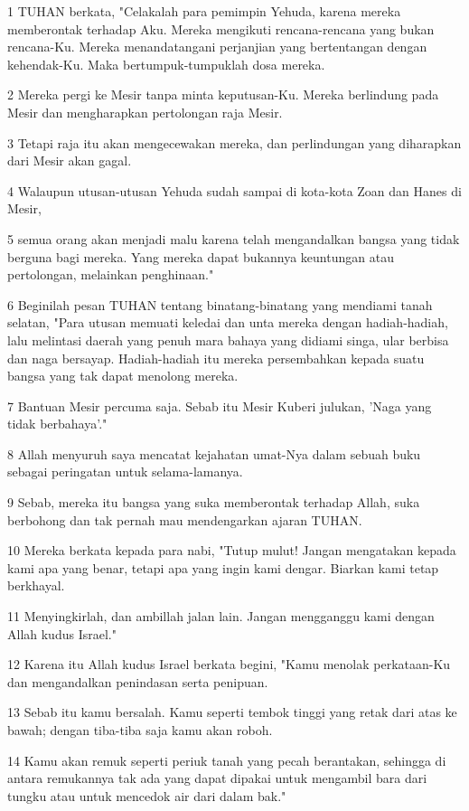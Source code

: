 \par 1 TUHAN berkata, "Celakalah para pemimpin Yehuda, karena mereka memberontak terhadap Aku. Mereka mengikuti rencana-rencana yang bukan rencana-Ku. Mereka menandatangani perjanjian yang bertentangan dengan kehendak-Ku. Maka bertumpuk-tumpuklah dosa mereka.
\par 2 Mereka pergi ke Mesir tanpa minta keputusan-Ku. Mereka berlindung pada Mesir dan mengharapkan pertolongan raja Mesir.
\par 3 Tetapi raja itu akan mengecewakan mereka, dan perlindungan yang diharapkan dari Mesir akan gagal.
\par 4 Walaupun utusan-utusan Yehuda sudah sampai di kota-kota Zoan dan Hanes di Mesir,
\par 5 semua orang akan menjadi malu karena telah mengandalkan bangsa yang tidak berguna bagi mereka. Yang mereka dapat bukannya keuntungan atau pertolongan, melainkan penghinaan."
\par 6 Beginilah pesan TUHAN tentang binatang-binatang yang mendiami tanah selatan, "Para utusan memuati keledai dan unta mereka dengan hadiah-hadiah, lalu melintasi daerah yang penuh mara bahaya yang didiami singa, ular berbisa dan naga bersayap. Hadiah-hadiah itu mereka persembahkan kepada suatu bangsa yang tak dapat menolong mereka.
\par 7 Bantuan Mesir percuma saja. Sebab itu Mesir Kuberi julukan, 'Naga yang tidak berbahaya'."
\par 8 Allah menyuruh saya mencatat kejahatan umat-Nya dalam sebuah buku sebagai peringatan untuk selama-lamanya.
\par 9 Sebab, mereka itu bangsa yang suka memberontak terhadap Allah, suka berbohong dan tak pernah mau mendengarkan ajaran TUHAN.
\par 10 Mereka berkata kepada para nabi, "Tutup mulut! Jangan mengatakan kepada kami apa yang benar, tetapi apa yang ingin kami dengar. Biarkan kami tetap berkhayal.
\par 11 Menyingkirlah, dan ambillah jalan lain. Jangan mengganggu kami dengan Allah kudus Israel."
\par 12 Karena itu Allah kudus Israel berkata begini, "Kamu menolak perkataan-Ku dan mengandalkan penindasan serta penipuan.
\par 13 Sebab itu kamu bersalah. Kamu seperti tembok tinggi yang retak dari atas ke bawah; dengan tiba-tiba saja kamu akan roboh.
\par 14 Kamu akan remuk seperti periuk tanah yang pecah berantakan, sehingga di antara remukannya tak ada yang dapat dipakai untuk mengambil bara dari tungku atau untuk mencedok air dari dalam bak."
